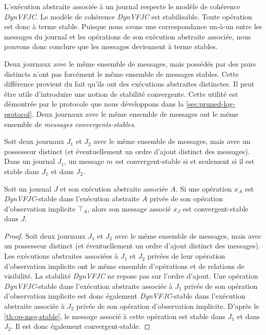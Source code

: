 L'exécution abstraite associée à un journal respecte le modèle de cohérence \emph{DynVFJC}.
Le modèle de cohérence \emph{DynVFJC} est stabilisable.
Toute opération est donc à terme stable.
Puisque nous avons une correspondance un-à-un entre les messages du journal et les opérations de son exécution abstraite associée, nous pouvons donc conclure que les messages deviennent à terme stables.


Deux journaux avec le même ensemble de messages, mais possédés par des pairs distincts n'ont pas forcément le même ensemble de messages stables.
Cette différence provient du fait qu'ils ont des exécutions abstraites distinctes.
Il peut être utile d'introduire une notion de stabilité convergente.
Cette utilité est démontrée par le protocole que nous développons dans la \autoref{sec:pruned-log-protocol}.
Deux journaux avec le même ensemble de messages ont le même ensemble de \emph{messages convergents-stables}.

\begin{definition}\label{def:msg-conv-stable}
Soit deux journaux $J_1$ et $J_2$ avec le même ensemble de messages, mais avec un possesseur distinct (et éventuellement un ordre d'ajout distinct des messages).
Dans un journal $J_1$, un message $m$ est convergent-stable si et seulement si il est stable dans $J_1$ et dans $J_2$.
\end{definition}

\begin{theorem}
Soit un journal $J$ et son exécution abstraite associée $A$.
Si une opération $x_A$ est \emph{DynVFJC}-stable dans l'exécution abstraite $A$ privée de son opération d'observation implicite $\top_A$, alors son message associé $x_J$ est convergent-stable dans $J$.
\end{theorem}

\begin{proof}
Soit deux journaux $J_1$ et $J_2$ avec le même ensemble de messages, mais avec un possesseur distinct (et éventuellement un ordre d'ajout distinct des messages).
Les exécutions abstraites associées à $J_1$ et $J_2$ privées de leur opération d'observation implicite ont le même ensemble d'opérations et de relations de visibilité.
La stabilité \emph{DynVFJC} ne repose pas sur l'ordre d'ajout.
Une opération \emph{DynVFJC}-stable dans l'exécution abstraite associée à $J_1$ privée de son opération d'observation implicite est donc également \emph{DynVFJC}-stable dans l'exécution abstraite associée à $J_2$ privée de son opération d'observation implicite.
D'après le \autoref{th:op-msg-stable}, le message associé à cette opération est stable dans $J_1$ et dans $J_2$.
Il est donc également convergent-stable.
\end{proof}

